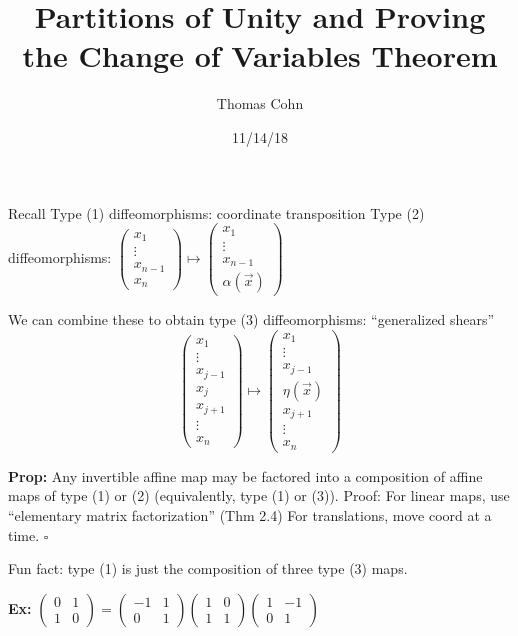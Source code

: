 \documentclass[10pt,letterpaper]{article}
\author{Thomas Cohn}
\title{Partitions of Unity and Proving the Change of Variables Theorem}
\date{11/14/18} %
\newcommand{\n}{\hfill\break}
\newcommand{\prop}[1]{\par\noindent\settowidth{\hangindent}{\textbf{Prop: }}\textbf{Prop: }#1\n}
\newcommand{\ex}[1]{\par\noindent\settowidth{\hangindent}{\textbf{Ex: }}\textbf{Ex: }#1\n}
\newcommand{\proven}{\;$\square$\n}
\newcommand{\paren}[1]{\left(#1\right)}
\begin{document}
\maketitle
\setlength\RaggedRightParindent{\parindent}
\RaggedRight

\par\noindent Recall\n
Type (1) diffeomorphisms: coordinate transposition\n
Type (2) diffeomorphisms: $\paren{\begin{array}{c}x_{1}\\ \vdots\\ x_{n-1}\\ x_{n}\end{array}}\mapsto\paren{\begin{array}{c}x_{1}\\ \vdots\\ x_{n-1}\\ \alpha(\vec{x})\end{array}}$\n

\par\noindent We can combine these to obtain type (3) diffeomorphisms: ``generalized shears''
\[
\paren{\begin{array}{c}x_{1}\\ \vdots\\ x_{j-1}\\ x_{j}\\ x_{j+1}\\ \vdots\\ x_{n}\end{array}}\mapsto\paren{\begin{array}{c}x_{1}\\ \vdots\\ x_{j-1}\\ \eta(\vec{x})\\ x_{j+1}\\ \vdots\\ x_{n}\end{array}}
\]

\prop{Any invertible affine map may be factored into a composition of affine maps of type (1) or (2) (equivalently, type (1) or (3)).\n
Proof: For linear maps, use ``elementary matrix factorization'' (Thm 2.4)\n
For translations, move coord at a time.\n
\proven}

\par\noindent Fun fact: type (1) is just the composition of three type (3) maps.\n

\ex{$\paren{\begin{array}{cc}0 & 1\\ 1 & 0\end{array}}=\paren{\begin{array}{cc}-1 & 1\\ 0 & 1\end{array}}\paren{\begin{array}{cc}1 & 0\\ 1 & 1\end{array}}\paren{\begin{array}{cc}1 & -1\\ 0 & 1\end{array}}$}
\end{document}
